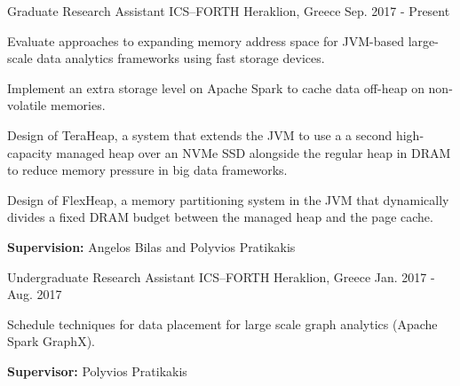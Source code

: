 

\begin{cventries}

  \cventry
    {Graduate Research Assistant} %
    {ICS--FORTH} %
    {Heraklion, Greece} %
    {Sep. 2017 - Present} %
    {
      \begin{cvitems} %
        \item {Evaluate approaches to expanding memory address space for
          JVM-based large-scale data analytics frameworks using fast storage
        devices.}
          \item{Implement an extra storage level on Apache Spark
              to cache data off-heap on non-volatile memories.}
            \item{Design of TeraHeap, a system that extends the JVM to use a a
                second high-capacity managed heap over an NVMe SSD alongside the
                regular heap in DRAM to reduce memory pressure in big data
              frameworks.}
            \item{Design of FlexHeap, a memory partitioning system in the JVM
                that dynamically divides a fixed DRAM budget between the managed
              heap and the page cache.}
        \item{\textbf{Supervision:} Angelos Bilas and Polyvios Pratikakis}
      \end{cvitems}
    }

  \cventry
    {Undergraduate Research Assistant} %
    {ICS--FORTH} %
    {Heraklion, Greece} %
    {Jan. 2017 - Aug. 2017} %
    {
      \begin{cvitems} %
        \item {Schedule techniques for data placement for large scale
            graph analytics (Apache Spark GraphX).}
        \item{\textbf{Supervisor:} Polyvios Pratikakis}
      \end{cvitems}
    }

\end{cventries}
